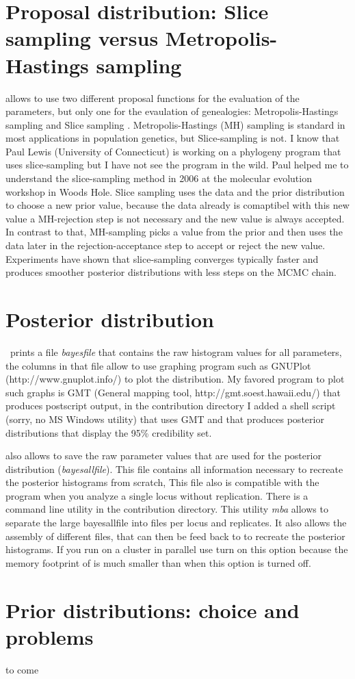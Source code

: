 \section{Proposal distribution: Slice sampling versus Metropolis-Hastings sampling}
\migrate allows to use two different proposal functions for the evaluation of the parameters, but only one for the evaulation of genealogies: Metropolis-Hastings sampling \cite{Metropolis:1953:ESC} and Slice sampling \citep{Neal:2003}. Metropolis-Hastings (MH) sampling is standard in most applications in population genetics, but Slice-sampling is not. I know that Paul Lewis (University of Connecticut) is working on a phylogeny program that uses slice-sampling but I have not see the program in the wild. Paul helped me to understand the slice-sampling method in 2006 at the molecular evolution workshop in Woods Hole.
Slice sampling uses the data and the prior distribution to choose a new prior value, because the data already is comaptibel with this new value a MH-rejection step is not necessary and the new value is always accepted. In contrast to that, MH-sampling picks a value from the prior and then uses the data later in the rejection-acceptance step to accept or reject the new value. Experiments have shown that slice-sampling converges  typically faster and produces smoother posterior distributions with less steps on the MCMC chain.

\section{Posterior distribution}
\migrate\ prints a file \textsl{bayesfile} that contains the raw histogram values for all parameters, the columns in that file allow to use  graphing program such as GNUPlot (http://www.gnuplot.info/) to plot the distribution. My favored program to plot such graphs is GMT (General mapping tool, http://gmt.soest.hawaii.edu/) that produces postscript output, in the contribution directory I added a shell script
(sorry, no MS Windows utility) that uses GMT and that produces posterior distributions that display the 95\% credibility set. 

\migrate also allows to save the raw parameter values that are used for the posterior distribution (\textsl{bayesallfile}). This file contains all information necessary to recreate the posterior histograms from scratch, This file also is compatible with the program \tracer \citep{Rambaut:2007} when you analyze a single locus without replication. There is a command line utility in the contribution directory. This utility \textsl{mba} allows to separate the large bayesallfile into files per locus and replicates. It also allows the assembly of different files, that can then be feed back to \migrate to recreate the posterior histograms.
If you run \migrate on a cluster in parallel use turn on this option because the memory footprint of \migrate is much smaller than when this option is turned off. 

\section{Prior distributions: choice and problems}
to come
